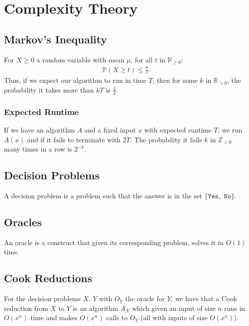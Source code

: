 \section{Complexity Theory}

\subsection{Markov's Inequality}

For $X \geq 0$ a random variable with mean $\mu$, for all
$t$ in $\mathbb{R}_{\geq 0}$: \begin{gather*}
  \mathbb{P}(X \geq t) \leq \frac{\mu}{t}.
\end{gather*} Thus, if we expect our algorithm to run in time $T$,
then for some $k$ in $\mathbb{R}_{> 0}$, the probability it
takes more than $kT$ is $\frac{1}{k}$.

\subsubsection{Expected Runtime}

If we have an algorithm $A$ and a fixed input $x$ with expected runtime
$T$, we run $A(x)$ and if it fails to terminate with $2T$. The probability
it fails $k$ in $\mathbb{Z}_{>0}$ many times in a row is $2^{-k}$.

\subsection{Decision Problems}

A decision problem is a problem such that the answer is in the set $\{\texttt{Yes},
\texttt{ No}\}$.

\subsection{Oracles}

An oracle is a construct that given its corresponding problem, solves it in
$O(1)$ time.

\subsection{Cook Reductions}

For the decision problems $X$, $Y$ with $O_Y$ the oracle for $Y$,
we have that a Cook reduction from $X$ to $Y$ is an algorithm $A_X$
which given an input of size $n$ runs in $O(x^n)$ time and makes
$O(x^n)$ calls to $O_Y$ (all with inputs of size $O(x^n)$).


